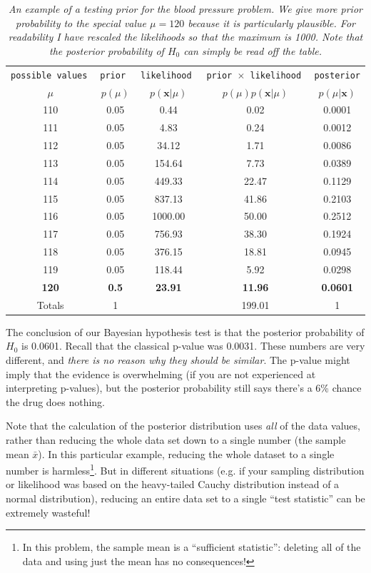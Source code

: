 \begin{table}[!ht]
\begin{center}
\begin{tabular}{|c|c|c|c|c|}
\hline
\tt{possible values} & \tt{prior} & \tt{likelihood} & \tt{prior} $\times$ \tt{likelihood} & \tt{posterior}\\
$\mu$ & $p(\mu)$ & $p(\boldsymbol{x}|\mu)$ & $p(\mu)p(\boldsymbol{x}|\mu)$ & $p(\mu|\boldsymbol{x})$\\
\hline
110 & 0.05 & 0.44	& 0.02 & 0.0001\\
111 & 0.05 & 4.83	& 0.24 & 0.0012\\
112 & 0.05 & 34.12	& 1.71 & 0.0086\\
113 & 0.05 & 154.64	& 7.73 & 0.0389\\
114 & 0.05 & 449.33	& 22.47 & 0.1129\\
115 & 0.05 & 837.13	& 41.86 & 0.2103\\
116 & 0.05 & 1000.00    & 50.00 & 0.2512\\
117 & 0.05 & 756.93	& 38.30 & 0.1924\\
118 & 0.05 & 376.15	& 18.81 & 0.0945\\
119 & 0.05 & 118.44	& 5.92 & 0.0298\\
{\bf 120} & {\bf 0.5}   & {\bf 23.91} & {\bf 11.96} & {\bf 0.0601}\\
\hline
Totals & 1 & & 199.01 & 1\\
\hline
\end{tabular}
\caption{\it An example of a testing prior for the blood pressure problem. We
give more prior probability to the special value $\mu=120$ because it is
particularly plausible. For readability I have rescaled the likelihoods so that
the maximum is 1000. Note that the posterior probability of $H_0$ can simply
be read off the table.
\label{tab:testing_prior}}
\end{center}
\end{table}

The conclusion of our Bayesian hypothesis test is that the posterior probability
of $H_0$ is 0.0601. Recall that the classical p-value was 0.0031. These numbers
are very different, and {\it there is no reason why they should be similar}. The
p-value might imply that the evidence is overwhelming (if you are not experienced
at interpreting p-values), but the posterior probability still says there's a
6\% chance the drug does nothing.

Note that the calculation of the posterior distribution uses {\it all} of the
data values, rather than reducing the whole data set down to a single number
(the sample mean $\bar{x}$). In this particular example, reducing the whole
dataset to a single number is harmless\footnote{In this problem, the sample mean
is a ``sufficient statistic'': deleting all of the data and using just the
mean has no consequences!}. But in different situations (e.g. if your sampling distribution
or likelihood was based on the heavy-tailed Cauchy distribution instead of a normal
distribution), reducing an entire data set to a single ``test statistic'' can
be extremely wasteful!

